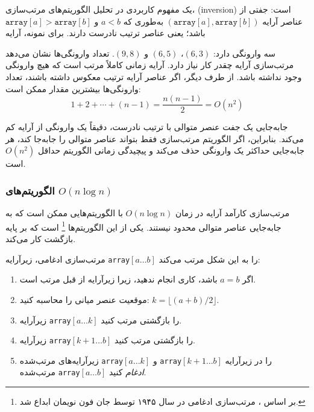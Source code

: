یک مفهوم کاربردی در تحلیل الگوریتم‌های مرتب‌سازی،
 (inversion) است:
جفتی از عناصر آرایه
$(\texttt{array}[a],\texttt{array}[b])$ به‌طوری که
$a<b$ و $\texttt{array}[a]>\texttt{array}[b]$ باشد؛
یعنی عناصر ترتیب نادرست دارند.
برای نمونه، آرایه
\begin{center}
\end{center}
سه وارونگی دارد: $(6,3)$، $(6,5)$ و $(9,8)$.
تعداد وارونگی‌ها نشان می‌دهد
مرتب‌سازی آرایه چقدر کار نیاز دارد.
آرایه زمانی کاملاً مرتب است که
هیچ وارونگی وجود نداشته باشد.
از طرف دیگر، اگر عناصر آرایه
ترتیب معکوس داشته باشند،
تعداد وارونگی‌ها بیشترین مقدار ممکن است:
\[1+2+\cdots+(n-1)=\frac{n(n-1)}{2} = O(n^2)\]

جابه‌جایی یک جفت عنصر متوالی با ترتیب نادرست،
دقیقاً یک وارونگی از آرایه کم می‌کند.
بنابراین، اگر الگوریتم مرتب‌سازی فقط بتواند
عناصر متوالی را جابه‌جا کند، هر جابه‌جایی حداکثر
یک وارونگی حذف می‌کند و پیچیدگی زمانی
الگوریتم حداقل $O(n^2)$ است.

\subsubsection{الگوریتم‌های $O(n \log n)$}


مرتب‌سازی کارآمد آرایه در زمان $O(n \log n)$
با الگوریتم‌هایی ممکن است که به جابه‌جایی عناصر متوالی محدود نیستند.
یکی از این الگوریتم‌ها \footnote{بر اساس \cite{knu983}،
مرتب‌سازی ادغامی در سال ۱۹۴۵ توسط جان فون نویمان ابداع شد.}
است که بر پایه بازگشت کار می‌کند.

مرتب‌سازی ادغامی، زیرآرایه \texttt{array}$[a \ldots b]$ را به این شکل مرتب می‌کند:

\begin{enumerate}
\item اگر $a=b$ باشد، کاری انجام ندهید، زیرا زیرآرایه از قبل مرتب است.
\item موقعیت عنصر میانی را محاسبه کنید: $k=\lfloor (a+b)/2 \rfloor$.
\item زیرآرایه \texttt{array}$[a \ldots k]$ را بازگشتی مرتب کنید.
\item زیرآرایه \texttt{array}$[k+1 \ldots b]$ را بازگشتی مرتب کنید.
\item زیرآرایه‌های مرتب‌شده \texttt{array}$[a \ldots k]$ و
\texttt{array}$[k+1 \ldots b]$ را در زیرآرایه مرتب‌شده \texttt{array}$[a \ldots b]$
\emph{ادغام} کنید.
\end{enumerate}

